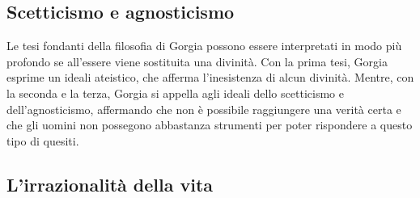 \documentclass[10pt,a4paper]{article}
\begin{document}
	\subsection{Scetticismo e agnosticismo}
	
	Le tesi fondanti della filosofia di Gorgia possono essere interpretati in modo più profondo se all'essere viene sostituita una divinità. Con la prima tesi, Gorgia esprime un ideali ateistico, che afferma l'inesistenza di alcun divinità. Mentre, con la seconda e la terza, Gorgia si appella agli ideali dello scetticismo e dell'agnosticismo, affermando che non è possibile raggiungere una verità certa e che gli uomini non possegono abbastanza strumenti per poter rispondere a questo tipo di quesiti.
	
	\subsection{L'irrazionalità della vita}
	
	
	
\end{document}
